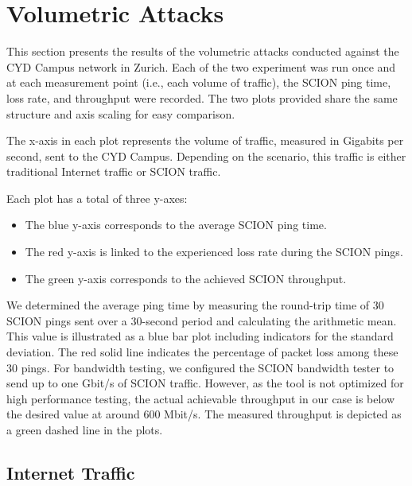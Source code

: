 \section{Volumetric Attacks}
\label{sec:volumetric-attacks}

This section presents the results of the volumetric attacks conducted against the CYD Campus network in Zurich.
Each of the two experiment was run once and at each measurement point (i.e., each volume of traffic), the SCION ping time, loss rate, and throughput were recorded.
The two plots provided share the same structure and axis scaling for easy comparison.

The x-axis in each plot represents the volume of traffic, measured in Gigabits per second, sent to the CYD Campus.
Depending on the scenario, this traffic is either traditional Internet traffic or SCION traffic.

Each plot has a total of three y-axes:
\begin{itemize}
    \item The blue y-axis corresponds to the average SCION ping time.
    \item The red y-axis is linked to the experienced loss rate during the SCION pings.
    \item The green y-axis corresponds to the achieved SCION throughput.
\end{itemize}

We determined the average ping time by measuring the round-trip time of 30 SCION pings sent over a 30-second period and calculating the arithmetic mean.
This value is illustrated as a blue bar plot including indicators for the standard deviation.
The red solid line indicates the percentage of packet loss among these 30 pings.
For bandwidth testing, we configured the SCION bandwidth tester to send up to one Gbit/s of SCION traffic.
However, as the tool is not optimized for high performance testing, the actual achievable throughput in our case is below the desired value at around 600 Mbit/s.
The measured throughput is depicted as a green dashed line in the plots.


\newpage

\subsection{Internet Traffic}

